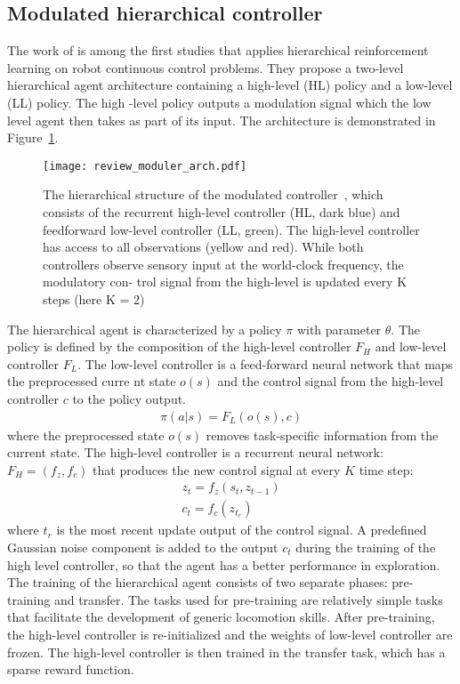 \subsection{Modulated hierarchical controller}
The work of \cite{heess2016learning} is among the first studies that applies hierarchical reinforcement learning on robot continuous control problems. They propose a two-level hierarchical agent architecture containing a high-level (HL) policy and a low-level (LL) policy. The high
-level policy  outputs a modulation signal which the low level agent then takes as part of its input. The architecture is demonstrated in Figure~\ref{review_moduler_arch}.
\begin{figure}[h]
	\texttt{[image: review\_moduler\_arch.pdf]}
	\centering
	\caption{The hierarchical structure of the modulated controller~\cite{heess2016learning}, which consists
		of the recurrent high-level controller (HL, dark blue) and
		feedforward low-level controller (LL, green).  The
		high-level controller has access to all observations (yellow and red). While both controllers observe sensory
		input at the world-clock frequency, the modulatory con-
		trol signal from the high-level is updated every K
		steps (here K = 2)}\label{review_moduler_arch}
\end{figure}
The hierarchical agent is characterized by a policy $\pi$ with parameter $\theta$. The policy is defined by the composition of the high-level controller $F_H$ and low-level controller $F_L$. The low-level controller is a feed-forward neural network that maps the preprocessed curre
nt state $o(s)$ and the control signal from the high-level controller $c$ to the policy output.
\begin{align}
\pi (a| s) = F_L(o(s),c)
\end{align}
where the preprocessed state $o(s)$ removes task-specific information from the current state.
The high-level controller is a recurrent neural network: $F_H = (f_z,f_c)$ that produces the new control signal at every $K$ time step:
\begin{align}
z_t = f_z(s_t,z_{t-1}) \\
c_t = f_c(z_{t_r})
\end{align}
where $t_r$ is the most recent update output of the control signal. A predefined Gaussian noise component is added to the output $c_t$ during the training of the high level controller, so that the agent has a better performance in exploration.
The training of the hierarchical agent consists of two separate phases: pre-training and transfer. The tasks used for pre-training are relatively simple tasks that facilitate the development of generic locomotion skills. After pre-training, the high-level controller is re-initialized and the weights of low-level controller are frozen. The high-level controller is then trained in the transfer task, which has a sparse reward function.
